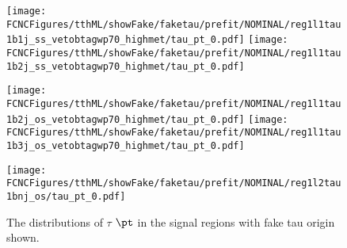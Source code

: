 \begin{figure}[H]
\centering
\texttt{[image: \\FCNCFigures/tthML/showFake/faketau/prefit/NOMINAL/reg1l1tau1b1j\_ss\_vetobtagwp70\_highmet/tau\_pt\_0.pdf]}
\texttt{[image: \\FCNCFigures/tthML/showFake/faketau/prefit/NOMINAL/reg1l1tau1b2j\_ss\_vetobtagwp70\_highmet/tau\_pt\_0.pdf]}

\texttt{[image: \\FCNCFigures/tthML/showFake/faketau/prefit/NOMINAL/reg1l1tau1b2j\_os\_vetobtagwp70\_highmet/tau\_pt\_0.pdf]}
\texttt{[image: \\FCNCFigures/tthML/showFake/faketau/prefit/NOMINAL/reg1l1tau1b3j\_os\_vetobtagwp70\_highmet/tau\_pt\_0.pdf]}

\texttt{[image: \\FCNCFigures/tthML/showFake/faketau/prefit/NOMINAL/reg1l2tau1bnj\_os/tau\_pt\_0.pdf]}

\caption{ The distributions of $\tau$ $\pt$ in the signal regions with fake tau origin shown. }
\label{fig:wjet_pt}
\end{figure}
